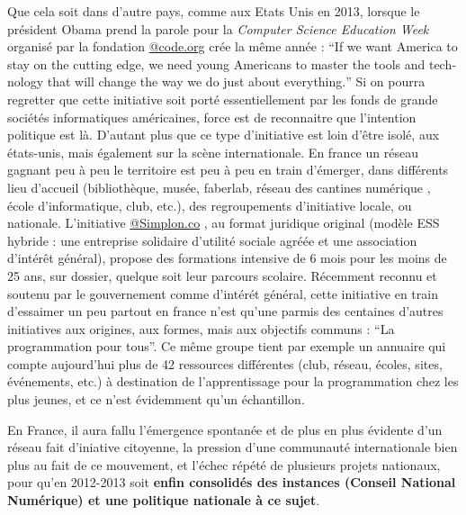 Que cela soit dans d'autre pays, comme aux Etats Unis en 2013, lorsque le président Obama prend la parole pour la \textit{Computer Science Education Week} organisé par la fondation \href{http://code.org}{@code.org} crée la même année : \foreignquote{english}{If we want America to stay on the cutting edge, we need young Americans to master the tools and technology that will change the way we do just about everything.} Si on pourra regretter que cette initiative soit porté essentiellement par les fonds de grande sociétés informatiques américaines, force est de reconnaitre que l'intention politique est là. D'autant plus que ce type d'initiative est loin d'être isolé, aux états-unis, mais également sur la scène internationale. En france un réseau gagnant peu à peu le territoire est peu à peu en train d'émerger, dans différents lieu d'accueil (bibliothèque, musée, faberlab, réseau des cantines numérique , école d'informatique, club, etc.), des regroupements d'initiative locale, ou nationale. L'initiative \href{http://Simplon.co}{@Simplon.co} , au format juridique original (modèle ESS hybride : une entreprise solidaire d’utilité sociale agréée et une association d’intérêt général), propose des formations intensive de 6 mois pour les moins de 25 ans, sur dossier, quelque soit leur parcours scolaire. Récemment reconnu et soutenu par le gouvernement comme d'intérét général, cette initiative en train d'essaimer un peu partout en france n'est qu'une parmis des centaines d'autres initiatives aux origines, aux formes, mais aux objectifs communs : \enquote{La programmation pour tous}. Ce même groupe tient par exemple un annuaire \autocite{Simplon2015} qui compte aujourd'hui plus de 42 ressources différentes (club, réseau, écoles, sites, événements, etc.) à destination de l'apprentissage pour la programmation chez les plus jeunes, et ce n'est évidemment qu'un échantillon.

En France, il aura fallu l'émergence spontanée et de plus en plus évidente d'un réseau fait d'iniative citoyenne, la pression d'une communauté internationale bien plus au fait de ce mouvement, et l'échec répété de plusieurs projets nationaux, pour qu'en 2012-2013 soit \textbf{ enfin consolidés des instances (Conseil National Numérique) et une politique nationale à ce sujet}.

